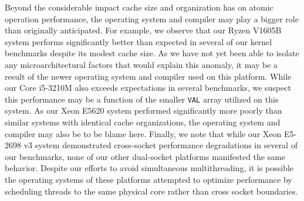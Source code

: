 Beyond the considerable impact cache size and organization has on atomic operation performance, the operating system and compiler may play a bigger role than originally anticipated.
For example, we observe that our Ryzen V1605B system performs significantly better than expected in several of our kernel benchmarks despite its modest cache size.
As we have not yet been able to isolate any microarchitectural factors that would explain this anomaly, it may be a result of the newer operating system and compiler used on this platform.
While our Core i5-3210M also exceeds expectations in several benchmarks, we suspect this performance may be a function of the smaller \texttt{VAL} array utilized on this system.
As our Xeon E5620 system performed significantly more poorly than similar systems with identical cache organizations, the operating system and compiler may also be to be blame here.
Finally, we note that while our Xeon E5-2698 v3 system demonstrated cross-socket performance degradations in several of our benchmarks, none of our other dual-socket platforms manifested the same behavior.
Despite our efforts to avoid simultaneous multithreading, it is possible the operating systems of these platforms attempted to optimize performance by scheduling threads to the same physical core rather than cross socket boundaries.